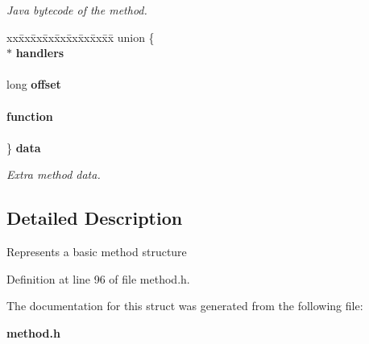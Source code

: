 \begin{DoxyCompactItemize}
\begin{DoxyCompactList}\small\item\em Java bytecode of the method. \item\end{DoxyCompactList}\item 
\begin{tabbing}
xx\=xx\=xx\=xx\=xx\=xx\=xx\=xx\=xx\=\kill
union \{\\
 $\ast$ {\bf handlers}\\
\>\\
\>long {\bf offset}\\
\>\\
 {\bf function}\\
\>\\
\} {\bf data}\label{structmethod__t_adda3efa77283fb738c57bb915a2a1f9f}
\\

\end{tabbing}\begin{DoxyCompactList}\small\item\em Extra method data. \item\end{DoxyCompactList}\end{DoxyCompactItemize}


\subsection{Detailed Description}
Represents a basic method structure 

Definition at line 96 of file method.h.



The documentation for this struct was generated from the following file:\begin{DoxyCompactItemize}
\item 
{\bf method.h}\end{DoxyCompactItemize}

